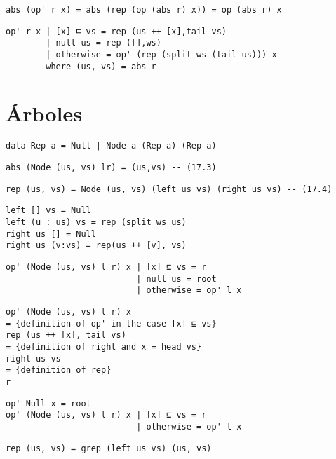 \begin{verbatim}
abs (op' r x) = abs (rep (op (abs r) x)) = op (abs r) x
\end{verbatim}

\begin{verbatim}
op' r x | [x] ⊑ vs = rep (us ++ [x],tail vs)
        | null us = rep ([],ws)
        | otherwise = op' (rep (split ws (tail us))) x
        where (us, vs) = abs r
\end{verbatim}

\section{Árboles}

\begin{verbatim}
data Rep a = Null | Node a (Rep a) (Rep a)
\end{verbatim}

\begin{verbatim}
abs (Node (us, vs) lr) = (us,vs) -- (17.3)
\end{verbatim}

\begin{verbatim}
rep (us, vs) = Node (us, vs) (left us vs) (right us vs) -- (17.4)
\end{verbatim}

\begin{verbatim}
left [] vs = Null
left (u : us) vs = rep (split ws us)
right us [] = Null
right us (v:vs) = rep(us ++ [v], vs)
\end{verbatim}

\begin{verbatim}
op' (Node (us, vs) l r) x | [x] ⊑ vs = r
                          | null us = root
                          | otherwise = op' l x
\end{verbatim}

\begin{verbatim}
op' (Node (us, vs) l r) x
= {definition of op' in the case [x] ⊑ vs}
rep (us ++ [x], tail vs)
= {definition of right and x = head vs}
right us vs
= {definition of rep}
r
\end{verbatim}

\begin{verbatim}
op' Null x = root
op' (Node (us, vs) l r) x | [x] ⊑ vs = r
                          | otherwise = op' l x
\end{verbatim}

\begin{verbatim}
rep (us, vs) = grep (left us vs) (us, vs)
\end{verbatim}

